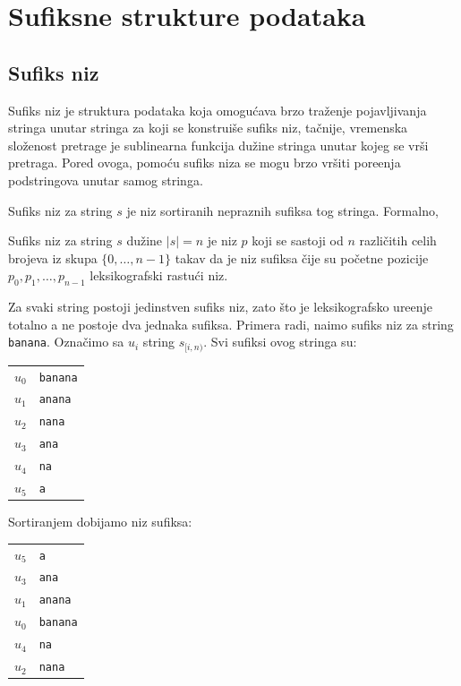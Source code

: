 \section{Sufiksne strukture podataka}

\subsection{Sufiks niz}

Sufiks niz je struktura podataka koja omogu\' cava brzo tra\v zenje pojavljivanja stringa unutar stringa za koji se konstrui\v se sufiks niz, ta\v cnije, vremenska slo\v zenost pretrage je sublinearna funkcija du\v zine stringa unutar kojeg se vr\v si pretraga. Pored ovoga, pomo\' cu sufiks niza se mogu brzo vr\v siti pore\dj enja podstringova unutar samog stringa. \cite{sufiksnizprvirad}

Sufiks niz za string $s$ je niz sortiranih nepraznih sufiksa tog stringa. Formalno,

\begin{dfn}
Sufiks niz za string $s$ du\v zine $|s| = n$ je niz $p$ koji se sastoji od $n$ razli\v citih celih brojeva iz skupa $\{0,\ldots,n-1\}$ takav da je niz sufiksa \v cije su po\v cetne pozicije $p_0, p_1, \ldots, p_{n-1}$ leksikografski rastu\' ci niz.
\end{dfn}

Za svaki string postoji jedinstven sufiks niz, zato \v sto je leksikografsko ure\dj enje totalno a ne postoje dva jednaka sufiksa. Primera radi, na\dj imo sufiks niz za string \texttt{banana}. Ozna\v cimo sa $u_i$ string $s_{[i,n)}$. Svi sufiksi ovog stringa su:

\begin{center}
\begin{tabular}{cl}
    $u_0$ & \texttt{banana} \\
    $u_1$ & \texttt{anana} \\
    $u_2$ & \texttt{nana} \\
    $u_3$ & \texttt{ana} \\
    $u_4$ & \texttt{na} \\
    $u_5$ & \texttt{a} \\
\end{tabular}
\end{center}

Sortiranjem dobijamo niz sufiksa:

\begin{center}
\begin{tabular}{cl}
    $u_5$ & \texttt{a} \\
    $u_3$ & \texttt{ana} \\
    $u_1$ & \texttt{anana} \\
    $u_0$ & \texttt{banana} \\
    $u_4$ & \texttt{na} \\
    $u_2$ & \texttt{nana} \\
\end{tabular}
\end{center}

